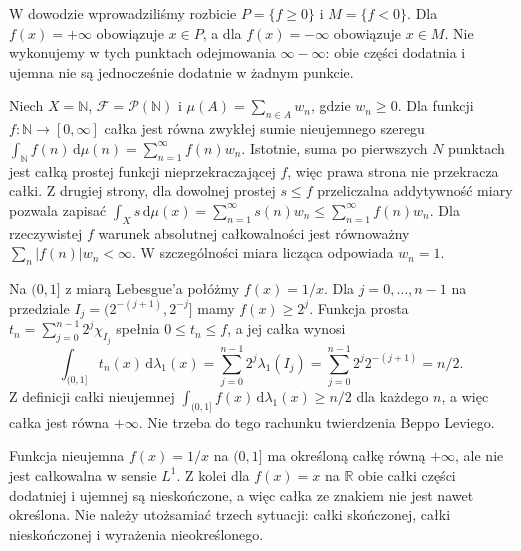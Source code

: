 \begin{uwaga}
W dowodzie wprowadziliśmy rozbicie
$P=\{f\ge0\}$ i $M=\{f<0\}$.
Dla $f(x)=+\infty$ obowiązuje $x\in P$,
a dla $f(x)=-\infty$ obowiązuje $x\in M$.
Nie wykonujemy w tych punktach odejmowania
$\infty-\infty$: obie części dodatnia i ujemna
nie są jednocześnie dodatnie w żadnym punkcie.
\end{uwaga}

\begin{przyklad}
Niech $X=\mathbb N$, $\mathcal F=\mathcal P(\mathbb N)$
i $\mu(A)=\sum_{n\in A}w_n$, gdzie $w_n\ge0$.
Dla funkcji $f:\mathbb N\to[0,\infty]$ całka
jest równa zwykłej sumie nieujemnego szeregu
$\int_{\mathbb N} f(n)\,\mathrm d\mu(n)=
\sum_{n=1}^{\infty}f(n)w_n$.
Istotnie, suma po pierwszych $N$ punktach jest
całką prostej funkcji nieprzekraczającej $f$,
więc prawa strona nie przekracza całki.
Z drugiej strony, dla dowolnej prostej $s\le f$
przeliczalna addytywność miary pozwala zapisać
$\int_X s\,\mathrm d\mu(x)=
\sum_{n=1}^{\infty}s(n)w_n\le\sum_{n=1}^{\infty}f(n)w_n$.
Dla rzeczywistej $f$ warunek absolutnej całkowalności
jest równoważny
$\sum_n|f(n)|w_n<\infty$.
W szczególności miara licząca odpowiada $w_n=1$.
\end{przyklad}

\begin{przyklad}
Na $(0,1]$ z miarą Lebesgue'a połóżmy $f(x)=1/x$.
Dla $j=0,\ldots,n-1$ na przedziale
$I_j=(2^{-(j+1)},2^{-j}]$ mamy $f(x)\ge2^j$.
Funkcja prosta
$t_n=\sum_{j=0}^{n-1}2^j\chi_{I_j}$
spełnia $0\le t_n\le f$, a jej całka wynosi
\[
\int_{(0,1]}t_n(x)\,\mathrm d\lambda_1(x)
=\sum_{j=0}^{n-1}2^j\lambda_1(I_j)
=\sum_{j=0}^{n-1}2^j2^{-(j+1)}=n/2.
\]
Z definicji całki nieujemnej
$\int_{(0,1]}f(x)\,\mathrm d\lambda_1(x)\ge n/2$
dla każdego $n$, a więc całka jest równa $+\infty$.
Nie trzeba do tego rachunku twierdzenia Beppo Leviego.
\end{przyklad}

\begin{uwaga}
Funkcja nieujemna $f(x)=1/x$ na $(0,1]$ ma
określoną całkę równą $+\infty$, ale nie jest
całkowalna w sensie $L^1$. Z kolei dla $f(x)=x$
na $\mathbb R$ obie całki części dodatniej i ujemnej
są nieskończone, a więc całka ze znakiem nie jest
nawet określona. Nie należy utożsamiać trzech sytuacji:
całki skończonej, całki nieskończonej i wyrażenia
nieokreślonego.
\end{uwaga}

